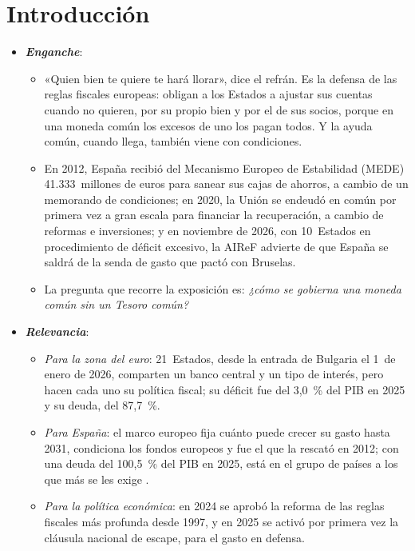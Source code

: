 \documentclass[11pt]{article}
\begin{document}
\tceetitulo


\section*{Introducción}

\begin{itemize}
\item \textbf{\emph{Enganche}}:
  \begin{itemize}
  \item «Quien bien te quiere te hará llorar», dice el refrán. Es la defensa de las reglas fiscales europeas: obligan a los Estados a ajustar sus cuentas cuando no quieren, por su propio bien y por el de sus socios, porque en una moneda común los excesos de uno los pagan todos. Y la ayuda común, cuando llega, también viene con condiciones.
  \item En 2012, España recibió del Mecanismo Europeo de Estabilidad (MEDE) 41.333~millones de euros para sanear sus cajas de ahorros, a cambio de un memorando de condiciones; en 2020, la Unión se endeudó en común por primera vez a gran escala para financiar la recuperación, a cambio de reformas e inversiones; y en noviembre de 2026, con 10~Estados en procedimiento de déficit excesivo, la AIReF advierte de que España se saldrá de la senda de gasto que pactó con Bruselas\nocite{MEDE2026Espana,AIReF2026Lineas}.
  \item La pregunta que recorre la exposición es: \emph{¿cómo se gobierna una moneda común sin un Tesoro común?}
  \end{itemize}

\item \textbf{\emph{Relevancia}}:
  \begin{itemize}
  \item \emph{Para la zona del euro}: 21~Estados, desde la entrada de Bulgaria el 1~de enero de 2026, comparten un banco central y un tipo de interés, pero hacen cada uno su política fiscal; su déficit fue del 3,0~\% del PIB en 2025 y su deuda, del 87,7~\%\nocite{Eurostat2026Notificacion}.
  \item \emph{Para España}: el marco europeo fija cuánto puede crecer su gasto hasta 2031, condiciona los fondos europeos y fue el que la rescató en 2012; con una deuda del 100,5~\% del PIB en 2025, está en el grupo de países a los que más se les exige .
  \item \emph{Para la política económica}: en 2024 se aprobó la reforma de las reglas fiscales más profunda desde 1997, y en 2025 se activó por primera vez la cláusula nacional de escape, para el gasto en defensa.
  \end{itemize}


\end{itemize}
\end{document}
